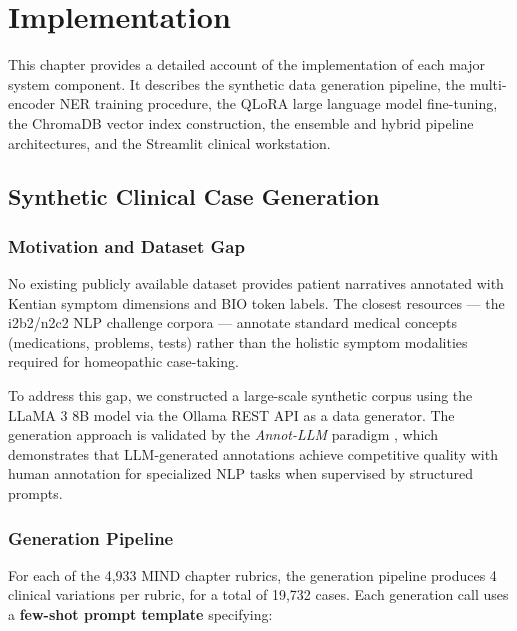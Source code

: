 
\chapter{Implementation}
\label{Chapter4}

This chapter provides a detailed account of the implementation of each major system component. It describes the synthetic data generation pipeline, the multi-encoder NER training procedure, the QLoRA large language model fine-tuning, the ChromaDB vector index construction, the ensemble and hybrid pipeline architectures, and the Streamlit clinical workstation.


\section{Synthetic Clinical Case Generation}

\subsection{Motivation and Dataset Gap}

No existing publicly available dataset provides patient narratives annotated with Kentian symptom dimensions and BIO token labels. The closest resources --- the i2b2/n2c2 NLP challenge corpora \cite{uzuner2011challenges} --- annotate standard medical concepts (medications, problems, tests) rather than the holistic symptom modalities required for homeopathic case-taking.

To address this gap, we constructed a large-scale synthetic corpus using the LLaMA 3 8B model via the Ollama REST API as a data generator. The generation approach is validated by the \textit{Annot-LLM} paradigm \cite{he2023annollm}, which demonstrates that LLM-generated annotations achieve competitive quality with human annotation for specialized NLP tasks when supervised by structured prompts.

\subsection{Generation Pipeline}

For each of the 4,933 MIND chapter rubrics, the generation pipeline produces 4 clinical variations per rubric, for a total of 19,732 cases. Each generation call uses a \textbf{few-shot prompt template} specifying:

